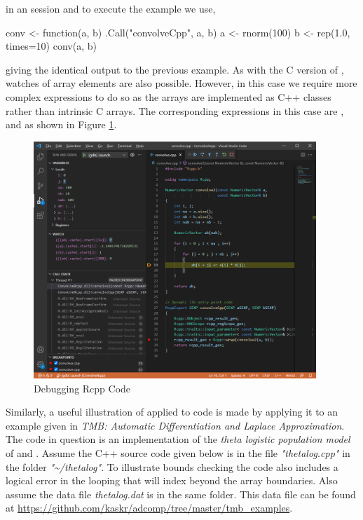 in an  session and to execute the example we use,

\begin{Schunk}
  \begin{Sinput}
  conv <- function(a, b) .Call("convolveCpp", a, b)
  a <- rnorm(100)
  b <- rep(1.0, times=10)
  conv(a, b)
  \end{Sinput}
\end{Schunk}

giving the identical output to the previous example. As with the C version of , watches of 
array elements are also possible. However, in this case we require more complex expressions to do so as the 
arrays are implemented as C++ classes rather than intrinsic C arrays. The corresponding expressions in this
case are ,  and  as 
shown in Figure \ref{fig:RcppDebug}.

\begin{Schunk}
  \begin{figure}[h]
  {\centering \includegraphics[width=0.95\textwidth]{RcppDebug} 

  }
  \caption[Debugging Rcpp Code]{Debugging Rcpp Code}\label{fig:RcppDebug}
  \end{figure}
\end{Schunk}

Similarly, a useful illustration of  applied to  code is made by applying it to an example given 
in \emph{TMB: Automatic Differentiation and Laplace Approximation}\citep{TMBlaplace}. The code in question is 
an implementation of the \emph{theta logistic population model} of \citep{WangG} and \citep{PedersenEtAl}.
Assume the C++ source code given below is in the file \emph{"thetalog.cpp"} in the folder \emph{"\textasciitilde/thetalog"}. 
To illustrate bounds checking the code also includes a logical error in the looping that will index beyond the array boundaries.
Also assume the data file \emph{thetalog.dat} is in the same folder. This data file can be found at 
\href{https://github.com/kaskr/adcomp/tree/master/tmb_examples}{https://github.com/kaskr/adcomp/tree/master/tmb\_examples}.

